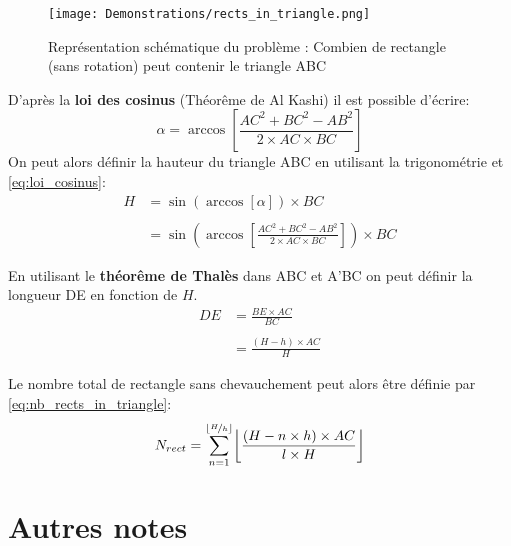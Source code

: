 \documentclass[12pt, oneside]{report}
\DeclarePairedDelimiter\floor{\lfloor}{\rfloor}
\begin{document}
\begin{figure}
    \begin{center}
        \texttt{[image: Demonstrations/rects\_in\_triangle.png]}
    \end{center}
    \caption{Représentation schématique du problème : Combien de rectangle
             (sans rotation) peut contenir le triangle ABC
             \label{fig:rects_in_triangle}}
\end{figure}

D’après la \textbf{loi des cosinus} (Théorême de Al Kashi) il est possible d’écrire:
\begin{equation}
        \alpha = \arccos \left[\frac{AC^{2} + BC^{2} - AB^{2}}{2 \times AC \times BC}\right]
    \label{eq:loi_cosinus}
\end{equation}
On peut alors définir la hauteur du triangle ABC en utilisant la trigonométrie et
\autoref{eq:loi_cosinus}:
\begin{equation}
    \begin{split}
        H &= \sin (\arccos[\alpha]) \times BC\\
        \\
          &= \sin \left(\arccos \left[\frac{AC^{2} + BC^{2} - AB^{2}}{2 \times AC \times BC}\right]\right) \times BC
    \end{split}
    \label{fig:height_triangle}
\end{equation}

En utilisant le \textbf{théorême de Thalès} dans ABC et A’BC on peut définir la longueur DE
en fonction de $H$.
\begin{equation}
    \begin{split}
        DE &= \frac{BE \times AC}{BC} \\
        \\
           &= \frac{(H - h) \times AC}{H}
    \end{split}
\end{equation}

Le nombre total de rectangle sans chevauchement peut alors être définie par \autoref{eq:nb_rects_in_triangle}:
\begin{equation}
    N_{rect} = \sum_{n = 1}^{\floor*{\nicefrac{H}{h}}} \floor*{\frac{(H - n \times h) \times AC}{l \times H}}
    \label{eq:nb_rects_in_triangle}
\end{equation}


\chapter*{Autres notes}
\end{document}
